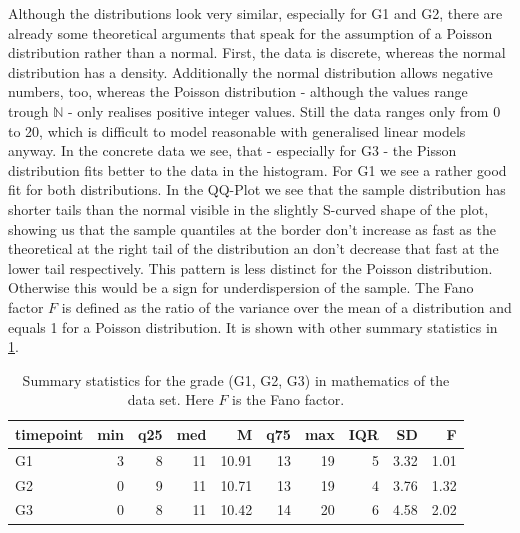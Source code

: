 Although the distributions look very similar, especially for G1 and G2, there are already some theoretical arguments that speak for the assumption of a Poisson distribution rather than a normal. First, the data is discrete, whereas the normal distribution has a density. Additionally the normal distribution allows negative numbers, too, whereas the Poisson distribution - although the values range trough $\mathbb{N}$ - only realises positive integer values. Still the data ranges only from 0 to 20, which is difficult to model reasonable with generalised linear models anyway. In the concrete data we see, that - especially for G3 - the Pisson distribution fits better to the data in the histogram. For G1 we see a rather good fit for both distributions. In the QQ-Plot we see that the sample distribution has shorter tails than the normal visible in the slightly S-curved shape of the plot, showing us that the sample quantiles at the border don't increase as fast as the theoretical at the right tail of the distribution an don't decrease that fast at the lower tail respectively. This pattern is less distinct for the Poisson distribution. Otherwise this would be a sign for underdispersion of the sample. The Fano factor $F$ is defined as the ratio of the variance over the mean of a distribution and equals 1 for a Poisson distribution. It is shown with other summary statistics in \ref{4tablegrades}. 
\begin{table}[ht]
\centering
\begin{tabular}{lrrrrrrrrr}
  \hline
 timepoint & min & q25 & med & M & q75 & max & IQR & SD & F \\ 
  \hline
   G1 &   3 &   8 &  11 & 10.91 &  13 &  19 &   5 & 3.32 & 1.01 \\ 
   G2 &   0 &   9 &  11 & 10.71 &  13 &  19 &   4 & 3.76 & 1.32 \\ 
   G3 &   0 &   8 &  11 & 10.42 &  14 &  20 &   6 & 4.58 & 2.02 \\ 
   \hline
\end{tabular}
\caption{Summary statistics for the grade (G1, G2, G3) in mathematics of the data set. Here $F$ is the Fano factor.}
\label{4tablegrades}
\end{table}

